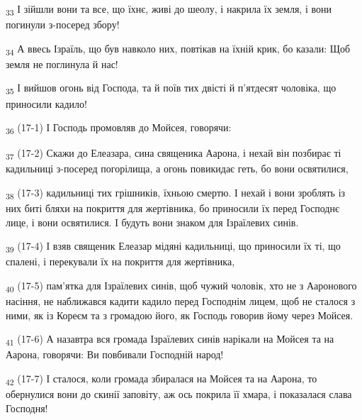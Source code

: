 \begin{tcolorbox}
\textsubscript{33} І зійшли вони та все, що їхнє, живі до шеолу, і накрила їх земля, і вони погинули з-посеред збору!
\end{tcolorbox}
\begin{tcolorbox}
\textsubscript{34} А ввесь Ізраїль, що був навколо них, повтікав на їхній крик, бо казали: Щоб земля не поглинула й нас!
\end{tcolorbox}
\begin{tcolorbox}
\textsubscript{35} І вийшов огонь від Господа, та й поїв тих двісті й п'ятдесят чоловіка, що приносили кадило!
\end{tcolorbox}
\begin{tcolorbox}
\textsubscript{36} (17-1) І Господь промовляв до Мойсея, говорячи:
\end{tcolorbox}
\begin{tcolorbox}
\textsubscript{37} (17-2) Скажи до Елеазара, сина священика Аарона, і нехай він позбирає ті кадильниці з-посеред погорілища, а огонь повикидає геть, бо вони освятилися,
\end{tcolorbox}
\begin{tcolorbox}
\textsubscript{38} (17-3) кадильниці тих грішників, їхньою смертю. І нехай і вони зроблять із них биті бляхи на покриття для жертівника, бо приносили їх перед Господнє лице, і вони освятилися. І будуть вони знаком для Ізраїлевих синів.
\end{tcolorbox}
\begin{tcolorbox}
\textsubscript{39} (17-4) І взяв священик Елеазар мідяні кадильниці, що приносили їх ті, що спалені, і перекували їх на покриття для жертівника,
\end{tcolorbox}
\begin{tcolorbox}
\textsubscript{40} (17-5) пам'ятка для Ізраїлевих синів, щоб чужий чоловік, хто не з Ааронового насіння, не наближався кадити кадило перед Господнім лицем, щоб не сталося з ними, як із Кореєм та з громадою його, як Господь говорив йому через Мойсея.
\end{tcolorbox}
\begin{tcolorbox}
\textsubscript{41} (17-6) А назавтра вся громада Ізраїлевих синів нарікали на Мойсея та на Аарона, говорячи: Ви повбивали Господній народ!
\end{tcolorbox}
\begin{tcolorbox}
\textsubscript{42} (17-7) І сталося, коли громада збиралася на Мойсея та на Аарона, то обернулися вони до скинії заповіту, аж ось покрила її хмара, і показалася слава Господня!
\end{tcolorbox}
